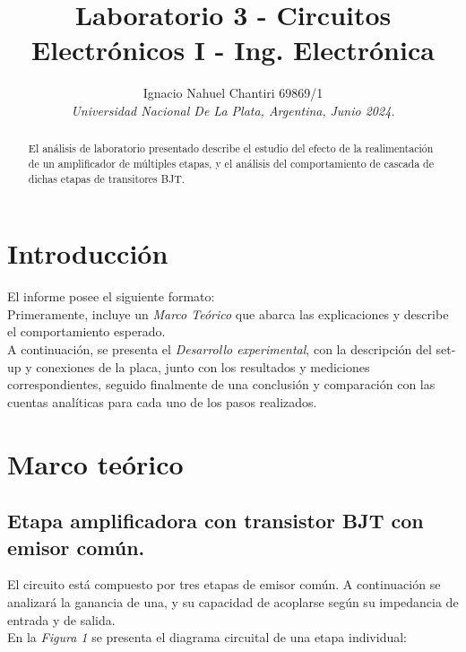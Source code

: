 \documentclass[letterpaper, 10 pt, conference]{ieeeconf}  %
\title{\LARGE \bf
Laboratorio 3 - Circuitos Electrónicos I - Ing. Electrónica
}
\author{Ignacio Nahuel Chantiri 69869/1 \\  %
{\it Universidad Nacional De La Plata, Argentina,}
{\it Junio 2024.}}                              %
\begin{document}
\maketitle
\thispagestyle{empty}
\pagestyle{empty}


\begin{abstract}

El análisis de laboratorio presentado describe el estudio del efecto de la realimentación de un amplificador de múltiples etapas, y el análisis del comportamiento de cascada de dichas etapas de transitores BJT.\\
\end{abstract}


\section{Introducci\'on}

El informe posee el siguiente formato:\\
Primeramente, incluye un \textit{Marco Teórico} que abarca las explicaciones y describe el comportamiento esperado.\\ A continuación, se presenta el \textit{Desarrollo experimental}, con la descripción del set-up y conexiones de la placa, junto con los resultados y mediciones correspondientes, seguido finalmente de una conclusión y comparación con las cuentas analíticas para cada uno de los pasos realizados.


\section{Marco teórico}



\subsection{\textbf{Etapa amplificadora con transistor BJT con emisor común.}}

El circuito está compuesto por tres etapas de emisor común. A continuación se analizará la ganancia de una, y su capacidad de acoplarse según su impedancia de entrada y de salida.\\
En la \textit{Figura 1} se presenta el diagrama circuital de una etapa individual:
\end{document}
